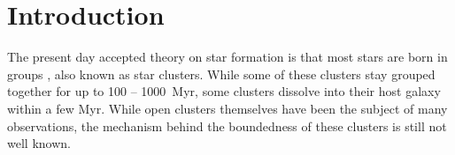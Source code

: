 \documentclass[12pt, twocolumn]{article}
\begin{document}

\section{Introduction}
The present day accepted theory on star formation is that most stars are born in groups \parencite{lada2003}, also known as star clusters.
While some of these clusters stay grouped together for up to 100 -- \SI{1000}{\mega yr}, some clusters dissolve into their host galaxy within a few \si{\mega yr}.
While open clusters themselves have been the subject of many observations, the mechanism behind the boundedness of these clusters is still not well known.
\end{document}
